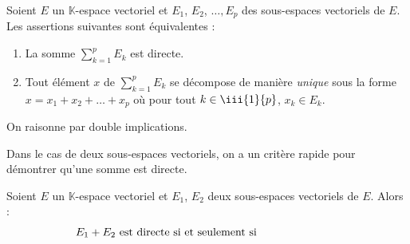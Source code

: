 \documentclass[french,11pt,twoside]{VcCours}
\newcommand{\Sum}[2]{\sum_{#1}^{#2}}
\begin{document}
\begin{Proposition}{}
Soient $E$ un $\mathbb{K}$-espace vectoriel et $E_1$, $E_2$, $\ldots, E_p$ des sous-espaces vectoriels de $E$. Les assertions suivantes sont équivalentes :
\begin{enumerate}
\item La somme $\Sum{k=1}{p} E_k$ est directe.
\item Tout élément $x$ de $\Sum{k=1}{p} E_k$ se décompose de manière \emph{unique} sous la forme $x = x_1 + x_2 + \ldots + x_p$ où pour tout $k \in \iii{1}{p}$, $x_k \in E_k$.
\end{enumerate}
\end{Proposition}

\begin{Demonstration}{} On raisonne par double implications.



\vspace{10cm}

\newpage

\phantom{bla}

\vspace{8.5cm}
%
%
\end{Demonstration}
 
 Dans le cas de deux sous-espaces vectoriels, on a un critère rapide pour démontrer qu'une somme est directe.
 
 \begin{Proposition}{}\label{SommeDir2}
 Soient $E$ un $\mathbb{K}$-espace vectoriel et $E_1$, $E_2$ deux sous-espaces vectoriels de $E$. Alors :
 $$ E_1 + E_2 \hbox{ est directe si et seulement si }\phantom{ E_1 \cap E_2 = \lbrace 0_E \rbrace} $$
 \end{Proposition}
 
\end{document}
